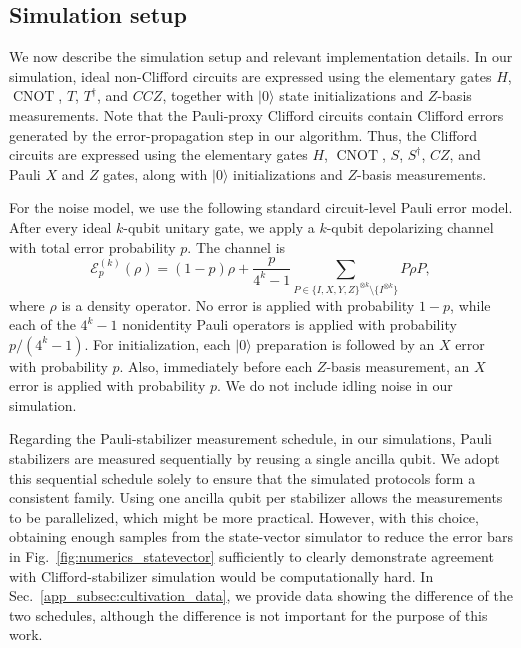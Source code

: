 \documentclass[
 reprint,
 amsmath,amssymb,
 pra,superscriptaddress, nofootinbib
]{revtex4-2}
\theoremstyle{definition}
\theoremstyle{plain}
\newcommand{\CNOT}{\operatorname{CNOT}}
\begin{document}
\subsection{Simulation setup}
\label{app_subsec:cultivation_setup}
We now describe the simulation setup and relevant implementation details.
In our simulation, ideal non-Clifford circuits are expressed using the elementary gates $H$, $\CNOT$, $T$, $T^\dagger$, and $CCZ$, together with $|0\rangle$ state initializations and $Z$-basis measurements. 
Note that the Pauli-proxy Clifford circuits contain Clifford errors generated by the error-propagation step in our algorithm. Thus, the Clifford circuits are expressed using the elementary gates $H$, $\CNOT$, $S$, $S^\dagger$, $CZ$, and Pauli $X$ and $Z$ gates, along with $|0\rangle$ initializations and $Z$-basis measurements.

For the noise model, we use the following standard circuit-level Pauli error model. After every ideal $k$-qubit unitary gate, we apply a $k$-qubit depolarizing channel with total error probability $p$. The channel is
\begin{equation}
    \mathcal{E}^{(k)}_p(\rho)
    =(1-p)\rho
    +\frac{p}{4^k-1}
      \sum_{P\in\{I,X,Y,Z \}^{\otimes k}\setminus\{I^{\otimes k}\}}
      P\rho P,
\end{equation}
where $\rho$ is a density operator.
No error is applied with probability $1-p$, while each of the $4^k-1$ nonidentity Pauli operators is applied with probability $p/(4^k-1)$.
For initialization, each $|0\rangle$ preparation is followed by an $X$ error with probability $p$. Also, immediately before each $Z$-basis measurement, an $X$ error is applied with probability $p$.
We do not include idling noise in our simulation.

Regarding the Pauli-stabilizer measurement schedule, in our simulations, Pauli stabilizers are measured sequentially by reusing a single ancilla qubit. We adopt this sequential schedule solely to ensure that the simulated protocols form a consistent family. Using one ancilla qubit per stabilizer allows the measurements to be parallelized, which might be more practical.
However, with this choice, obtaining enough samples from the state-vector simulator to reduce the error bars in Fig.~\ref{fig:numerics_statevector} sufficiently to clearly demonstrate agreement with Clifford-stabilizer simulation would be computationally hard.
In Sec.~\ref{app_subsec:cultivation_data}, we provide data showing the difference of the two schedules, although the difference is not important for the purpose of this work.
\end{document}
